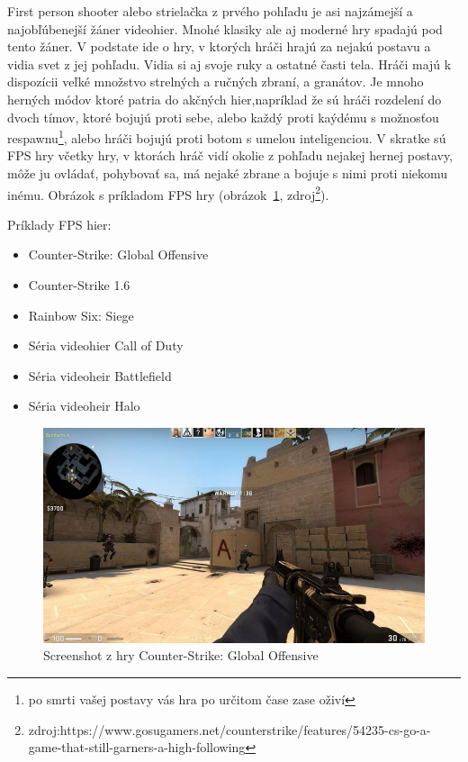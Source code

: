 \documentclass[10pt,oneside,slovak,a4paper]{article}
\begin{document}
First person shooter alebo strielačka z prvého pohľadu je asi najzámejší a najobľúbenejší žáner videohier. Mnohé klasiky ale aj moderné hry spadajú pod tento žáner. V podstate ide o hry, v ktorých hráči hrajú za nejakú postavu a vidia svet z jej pohľadu. Vidia si aj svoje ruky a ostatné časti tela. Hráči majú k dispozícii veľké množstvo strelných a ručných zbraní, a granátov. Je mnoho herných módov ktoré patria do akčných hier,napríklad že sú hráči rozdelení do dvoch tímov, ktoré bojujú proti sebe, alebo každý proti kaýdému s možnosťou respawnu\footnote{po smrti vašej postavy vás hra po určitom čase zase oživí}, alebo hráči bojujú proti botom s umelou inteligenciou. V skratke sú FPS hry včetky hry, v ktorách hráč vidí okolie z pohľadu nejakej hernej postavy, môže ju ovládať, pohybovať sa, má nejaké zbrane a bojuje s nimi proti niekomu inému. Obrázok s príkladom FPS hry (obrázok~\ref{f:csgo}, zdroj\footnote{zdroj:https://www.gosugamers.net/counterstrike/features/54235-cs-go-a-game-that-still-garners-a-high-following}). 

Príklady FPS hier:
\begin{itemize}
\item Counter-Strike: Global Offensive
\item Counter-Strike 1.6
\item Rainbow Six: Siege
\item Séria videohier Call of Duty
\item Séria videoheir Battlefield
\item Séria videoheir Halo
\end{itemize}

\begin{figure}[ht]
\centering
\includegraphics[scale=0.16]{csgo.jpg}
\caption{Screenshot z hry Counter-Strike: Global Offensive}
\label{f:csgo}
\end{figure}
\end{document}
